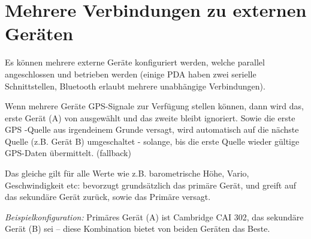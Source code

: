 \section{Mehrere Verbindungen zu externen Geräten}

Es können mehrere externe Geräte konfiguriert werden, welche parallel angeschlossen und betrieben werden (einige \textsf{PDA} haben zwei serielle Schnittstellen, Bluetooth erlaubt mehrere unabhängige Verbindungen).

Wenn mehrere Geräte GPS-Signale zur Verfügung stellen können, dann wird das, erste Gerät (A) von \xc ausgewählt und das zweite bleibt ignoriert. Sowie die erste GPS -Quelle aus irgendeinem Grunde versagt, wird automatisch auf die nächste Quelle (z.B. Gerät B) umgeschaltet - solange, bis die erste Quelle wieder gültige GPS-Daten übermittelt. (fallback)

Das gleiche gilt für alle Werte wie z.B. barometrische Höhe, Vario, Geschwindigkeit etc:
\xc bevorzugt grundsätzlich das primäre Gerät, und greift auf das sekundäre Gerät zurück, sowie das Primäre versagt.

\textit{Beispielkonfiguration:}
Primäres Gerät (A) ist Cambridge CAI 302, das sekundäre Gerät (B) sei \fl -- diese Kombination bietet von beiden Geräten das Beste.
